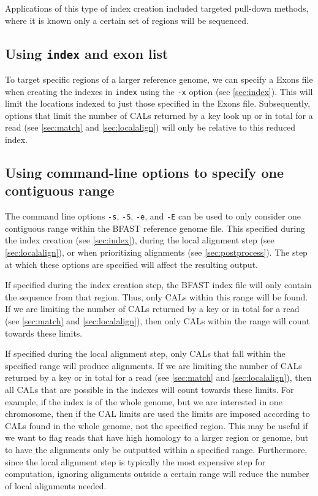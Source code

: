 \documentclass[a4paper,12pt]{book}
\newcommand{\TT}[1]{{\tt #1}} %
\newcommand{\BRGF}{BFAST reference genome file} %
\newcommand{\BIF}{BFAST index file} %
\begin{document}
Applications of this type of index creation included targeted pull-down methods, where it is known only a certain set of regions will be sequenced.
\subsection{Using \TT{index} and exon list}
\label{sec:using-exon-list}
To target specific regions of a larger reference genome, we can specify a Exons file when creating the indexes in \TT{index} using the \TT{-x} option (see \autoref{sec:index}). 
This will limit the locations indexed to just those specified in the Exons file.
Subsequently, options that limit the number of CALs returned by a key look up or in total for a read (see \autoref{sec:match} and \autoref{sec:localalign}) will only be relative to this reduced index.

\subsection{Using command-line options to specify one contiguous range}
The command line options \TT{-s}, \TT{-S}, \TT{-e}, and \TT{-E} can be used to only consider one contiguous range within the \BRGF{}.
This specified during the index creation (see \autoref{sec:index}), during the local alignment step (see \autoref{sec:localalign}), or when prioritizing alignments (see \autoref{sec:postprocess}). 
The step at which these options are specified will affect the resulting output.

If specified during the index creation step, the \BIF{} will only contain the sequence from that region.
Thus, only CALs within this range will be found.
If we are limiting the number of CALs returned by a key or in total for a read (see \autoref{sec:match} and \autoref{sec:localalign}), then only CALs within the range will count towards these limits.

If specified during the local alignment step, only CALs that fall within the specified range will produce alignments.
If we are limiting the number of CALs returned by a key or in total for a read (see \autoref{sec:match} and \autoref{sec:localalign}), then all CALs that are possible in the indexes will count towards these limits.
For example, if the index is of the whole genome, but we are interested in one chromosome, then if the CAL limits are used the limits are imposed according to CALs found in the whole genome, not the specified region.
This may be useful if we want to flag reads that have high homology to a larger region or genome, but to have the alignments only be outputted within a specified range.
Furthermore, since the local alignment step is typically the most expensive step for computation, ignoring alignments outside a certain range will reduce the number of local alignments needed.
\end{document}
